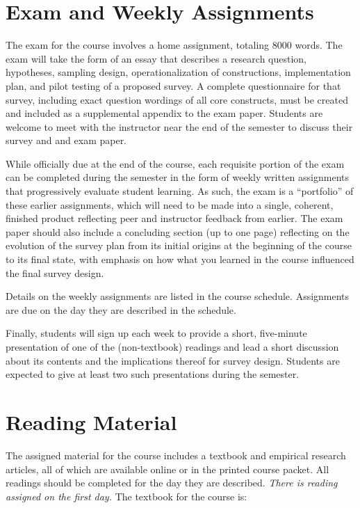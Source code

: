 \documentclass[11pt,a4paper]{article}
\begin{document}
\section{Exam and Weekly Assignments}
The exam for the course involves a home assignment, totaling 8000 words. The exam will take the form of an essay that describes a research question, hypotheses, sampling design, operationalization of constructions, implementation plan, and pilot testing of a proposed survey. A complete questionnaire for that survey, including exact question wordings of all core constructs, must be created and included as a supplemental appendix to the exam paper. Students are welcome to meet with the instructor near the end of the semester to discuss their survey and and exam paper.

While officially due at the end of the course, each requisite portion of the exam can be completed during the semester in the form of weekly written assignments that progressively evaluate student learning. As such, the exam is a ``portfolio'' of these earlier assignments, which will need to be made into a single, coherent, finished product reflecting peer and instructor feedback from earlier. The exam paper should also include a concluding section (up to one page) reflecting on the evolution of the survey plan from its initial origins at the beginning of the course to its final state, with emphasis on how what you learned in the course influenced the final survey design.

Details on the weekly assignments are listed in the course schedule. Assignments are due on the day they are described in the schedule.

Finally, students will sign up each week to provide a short, five-minute presentation of one of the (non-textbook) readings and lead a short discussion about its contents and the implications thereof for survey design. Students are expected to give at least two such presentations during the semester.


\section{Reading Material}
The assigned material for the course includes a textbook and empirical research articles, all of which are available online or in the printed course packet. All readings should be completed for the day they are described. {\em There is reading assigned on the first day.} The textbook for the course is:\\
\end{document}
